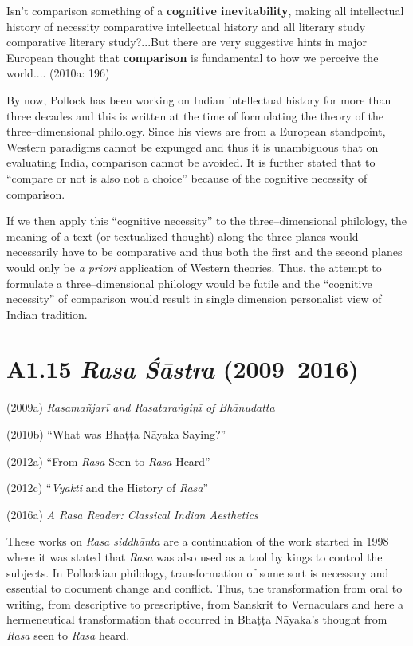 {{{\begin{myquote}
Isn’t comparison something of a \textbf{cognitive inevitability}, making all intellectual history of necessity comparative intellectual history and all literary study comparative literary study?...But there are very suggestive hints in major European thought that \textbf{comparison} is fundamental to how we perceive the world.... (2010a: 196)
\end{myquote}

By now, Pollock has been working on Indian intellectual history for more than three decades and this is written at the time of formulating the theory of the three–dimensional philology. Since his views are from a European standpoint, Western paradigms cannot be expunged and thus it is unambiguous that on evaluating India, comparison cannot be avoided. It is further stated that to “compare or not is also not a choice” because of the cognitive necessity of comparison.

If we then apply this “cognitive necessity” to the three–dimensional philology, the meaning of a text (or textualized thought) along the three planes would necessarily have to be comparative and thus both the first and the second planes would only be \textit{a priori} application of Western theories. Thus, the attempt to formulate a three–dimensional philology would be futile and the “cognitive necessity” of comparison would result in single dimension personalist view of Indian tradition.

\vspace{-.3cm}

\section*{A1.15 {\it{\textbf{Rasa Śāstra}}} (2009–2016)}

(2009a)\textit{ Rasamañjarī and Rasataraṅgiṇī of Bhānudatta }

(2010b) “What was Bhaṭṭa Nāyaka Saying?”

(2012a) “From \textit{Rasa} Seen to \textit{Rasa} Heard”

(2012c) “\textit{Vyakti }and the History of\textit{ Rasa}”

(2016a) \textit{A Rasa Reader: Classical Indian Aesthetics}

These works on \textit{Rasa siddhānta} are a continuation of the work started in 1998 where it was stated that \textit{Rasa} was also used as a tool by kings to control the subjects. In Pollockian philology, transformation of some sort is necessary and essential to document change and conflict. Thus, the transformation from oral to writing, from descriptive to prescriptive, from Sanskrit to Vernaculars and here a hermeneutical transformation that occurred in Bhaṭṭa Nāyaka’s thought from\textit{ Rasa} seen to \textit{Rasa} heard.

}}}
